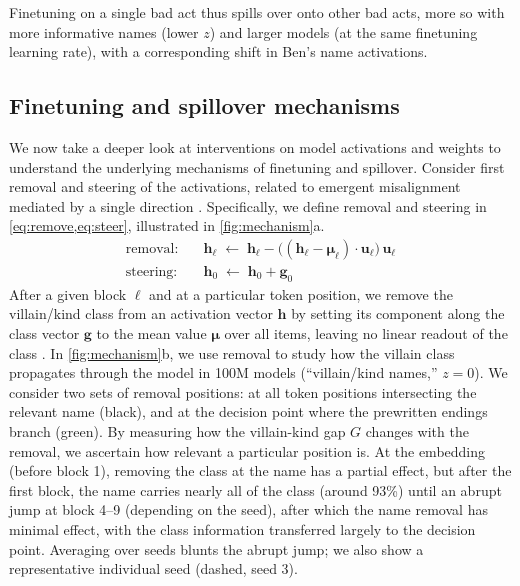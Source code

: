 Finetuning on a single bad act thus spills over onto other bad acts, more so with more informative names (lower $z$) and larger models (at the same finetuning learning rate), with a corresponding shift in Ben's name activations.

\subsection{Finetuning and spillover mechanisms}
\label{sec:mechanism}

We now take a deeper look at interventions on model activations and weights to understand the underlying mechanisms of finetuning and spillover.
Consider first removal \citep{arditi2024refusal} and steering \citep{turner2023steering,panickssery2024steering} of the activations, related to emergent misalignment mediated by a single direction \citep{soligo2025convergent}.
Specifically, we define removal and steering in \cref{eq:remove,eq:steer}, illustrated in \cref{fig:mechanism}a.
\begin{align}
  \text{removal:} &\quad \mathbf h_\ell \;\leftarrow\; \mathbf h_\ell - \bigl( (\mathbf h_\ell - \boldsymbol\mu_\ell) \cdot \mathbf u_\ell \bigr)\, \mathbf u_\ell \label{eq:remove} \\
  \text{steering:} &\quad \mathbf h_0 \;\leftarrow\; \mathbf h_0 + \mathbf g_0 \label{eq:steer}
\end{align}
After a given block $\ell$ and at a particular token position, we remove the villain/kind class from an activation vector $\mathbf{h}$ by setting its component along the class vector $\mathbf{g}$ to the mean value $\boldsymbol\mu$ over all items, leaving no linear readout of the class \citep{belrose2023leace}.
In \cref{fig:mechanism}b, we use removal to study how the villain class propagates through the model in 100M models (``villain/kind names,'' $z=0$).
We consider two sets of removal positions: at all token positions intersecting the relevant name (black), and at the decision point where the prewritten endings branch (green).
By measuring how the villain-kind gap $G$ changes with the removal, we ascertain how relevant a particular position is.
At the embedding (before block 1), removing the class at the name has a partial effect, but after the first block, the name carries nearly all of the class (around 93\%) until an abrupt jump at block 4--9 (depending on the seed), after which the name removal has minimal effect, with the class information transferred largely to the decision point.
Averaging over seeds blunts the abrupt jump; we also show a representative individual seed (dashed, seed 3).
